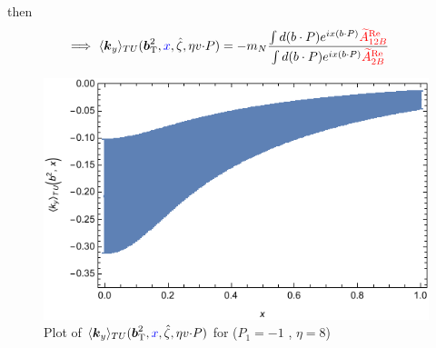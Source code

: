 \documentclass[]{article}
\numberwithin{equation}{section}
\newcommand{\tcdot}{{\cdot}}
\newcommand{\vect}[1]{\ensuremath{\boldsymbol{#1}}}
\newcommand{\vprp}[1]{\vect{#1}_{\mathrm T}}
\newcommand{\tAmp}{\widetilde{A}}
\newcommand{\tAmp}{\ensuremath{\widetilde{A}^{(+)}}}
\newcommand{\bvec}{b}
\newcommand{\zetahat}{{\hat \zeta}}
\begin{document}
then
\begin{align}
     \Longrightarrow~ \langle \vect{k}_y \rangle_{TU}(\vprp{\bvec}^2,\textcolor{blue}{x},\zetahat,\eta v \tcdot P) 
	&=-m_{N} \frac{\int d(b\cdot P)e^{ix(b\cdot P)} \textcolor{red}{\tAmp_{12B}^{\text{Re}}}}{\int d(b\cdot P)e^{ix(b\cdot P)}\textcolor{red}{\tAmp_{2B}^{\text{Re}}}}
\end{align}

\begin{figure}
    \centering
    \includegraphics[width=0.5\linewidth]{Fourierx_SiversShift_ampname_b_bnum_P1_-1_eta_8.pdf}
    \caption{Plot of $\langle \vect{k}_y \rangle_{TU}(\vprp{\bvec}^2,\textcolor{blue}{x},\zetahat,\eta v \tcdot P) $ for ($P_{1} = -1$ , $\eta=8$)}
    \label{fig:enter-label}
\end{figure}
\end{document}
